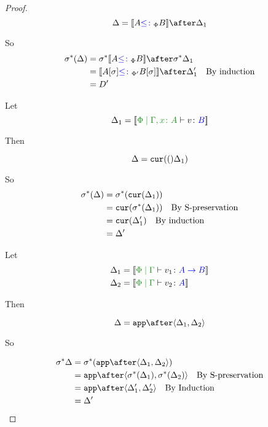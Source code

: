 \documentclass{report}
\begin{document}
\begin{framed}
\begin{proof}
    \begin{equation}
        \D = \deno{A\subtypep B}\after \D_1\\
    \end{equation}
    
    So 
    \begin{align*}
        \si\star(\D) & = \si\star{\deno{A\subtypep B}}\after\si\star\D_1 \\
        & = \deno{A\ssi\subtypepp B\ssi}\after\D_1'\qt{By induction}\\
        & = D'
    \end{align*}
    
    \case{\vfun}
    Let \begin{equation}
        \D_1 = \deno{\etyperelation{\P}{\gax}{v}{B}}
    \end{equation}
    
    Then
    
    \begin{equation}
        \Delta = \texttt{cur}(()\Delta_1)\\
    \end{equation}
    
    So
    \begin{align*}
        \sigma^*(\Delta) & = \sigma^*(\texttt{cur}(\Delta_1))\\
        & = \texttt{cur}(\sigma^*(\Delta_1))\quad\text{By S-preservation}\\
        & = \texttt{cur}(\Delta_1')\quad\text{By induction}\\
        & = \Delta'
    \end{align*}
    
    \case{\vapply}
    Let \begin{align*}
        \D_1 &= \deno{\gpetyperelation{v_1}{\ab}}\\
        \D_2 &= \deno{\gpetyperelation{v_2}{A}}
    \end{align*}
    
    Then
    
    \begin{equation}
        \D = \app\after\pr{\D_1}{\D_2}\\
    \end{equation}
    
    So
    
    \begin{align*}
        \si\star\D & = \si\star(\app\after\pr{\D_1}{\D_2})\\
        & = \app\after\pr{\si\star(\D_1)}{\si\star(\D_2)}\qt{By S-preservation}\\
        & = \app\after\pr{\D_1'}{\D_2'}\qt{By Induction}\\
        & = \D'
    \end{align*}
    

\end{proof}
\end{framed}
\end{document}
